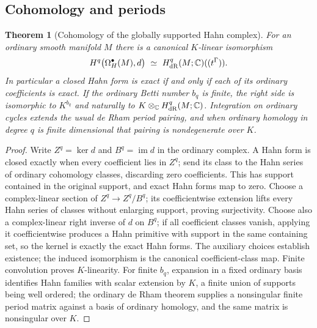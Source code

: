 \documentclass[11pt,letterpaper]{article}
\newtheorem{theorem}{Theorem}[section]
\theoremstyle{definition}
\theoremstyle{remark}
\newcommand{\dR}{\mathrm{dR}}
\numberwithin{equation}{section}
\begin{document}
\subsection{Cohomology and periods}
\begin{theorem}[Cohomology of the globally supported Hahn complex]
\label{contours:thm:cohomology}
For an ordinary smooth manifold $M$ there is a canonical $K$-linear isomorphism
\begin{equation}\label{contours:eq:cohomology}
  H^q\bigl(\Omega_H^\bullet(M),d\bigr)
  \ \simeq\ H^q_{\dR}(M;\C)((t^\Gamma)).
\end{equation}
In particular a closed Hahn form is exact if and only if each of its ordinary
coefficients is exact. If the ordinary Betti number $b_q$ is finite, the right side
is isomorphic to $K^{b_q}$ and naturally to $K\otimes_\C H^q_\dR(M;\C)$.
Integration on ordinary cycles extends the usual de Rham period pairing, and when
ordinary homology in degree $q$ is finite dimensional that pairing is nondegenerate
over $K$.
\end{theorem}
\begin{proof}
Write $Z^q=\ker d$ and $B^q=\operatorname{im}d$ in the ordinary complex. A Hahn
form is closed exactly when every coefficient lies in $Z^q$; send its class to the
Hahn series of ordinary cohomology classes, discarding zero coefficients. This has
support contained in the original support, and exact Hahn forms map to zero.
Choose a complex-linear section of $Z^q\to Z^q/B^q$; its coefficientwise extension
lifts every Hahn series of classes without enlarging support, proving surjectivity.
Choose also a complex-linear right inverse of $d$ on $B^q$; if all coefficient
classes vanish, applying it coefficientwise produces a Hahn primitive with support
in the same containing set, so the kernel is exactly the exact Hahn forms. The
auxiliary choices establish existence; the induced isomorphism is the canonical
coefficient-class map. Finite convolution proves $K$-linearity. For finite $b_q$,
expansion in a fixed ordinary basis identifies Hahn families with scalar extension
by $K$, a finite union of supports being well ordered; the ordinary de Rham theorem
supplies a nonsingular finite period matrix against a basis of ordinary homology,
and the same matrix is nonsingular over $K$.
\end{proof}
\end{document}

